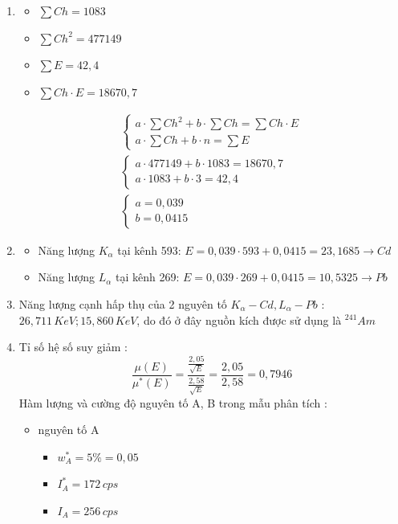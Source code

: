 \documentclass[a4paper]{article}
\begin{document}
\section{}
\begin{enumerate}[label=\alph*)]
    \item \hfill 
    \begin{itemize}
        \item $\sum Ch = 1083$
        \item $\sum Ch^2 = 477149$
        \item $\sum E = 42,4$
        \item $\sum Ch \cdot E = 18670,7$
    \end{itemize}
    \begin{gather*}
        \begin{cases}
            a \cdot \sum Ch^2 + b \cdot \sum Ch = \sum Ch \cdot E \\ a  \cdot \sum Ch + b \cdot n = \sum E
        \end{cases}\\
        \begin{cases}
            a \cdot 477149 + b \cdot 1083 = 18670,7 \\ a  \cdot 1083 + b \cdot 3 = 42,4
        \end{cases}\\
        \begin{cases}
            a = 0,039 \\ b = 0,0415
        \end{cases}
    \end{gather*}
    \item 
    \begin{itemize}
        \item Năng lượng $K_\alpha$ tại kênh 593: $E = 0,039 \cdot 593 + 0,0415 = 23,1685 \longrightarrow Cd$
        \item Năng lượng $L_\alpha$ tại kênh 269: $E = 0,039 \cdot 269 + 0,0415 = 10,5325 \longrightarrow Pb$
    \end{itemize}
    \item 
    Năng lượng cạnh hấp thụ của 2 nguyên tố $K_\alpha-Cd, L_\alpha-Pb$ : $26,711\, KeV; 15,860\, KeV$, do đó ở đây nguồn kích được sử dụng là $^{241}Am$
    \item 
    Tỉ số hệ số suy giảm : \[\frac{\mu(E)}{\mu^*(E)} = \frac{\frac{2,05}{\sqrt{E}}}{\frac{2,58}{\sqrt{E}}} = \frac{2,05}{2,58} = 0,7946\]
    Hàm lượng và cường độ nguyên tố A, B trong mẫu phân tích : 
    \begin{itemize}
        \item nguyên tố A 
        \begin{itemize}
            \item $w_A^* = 5\% = 0,05$
            \item $I^*_A = 172 \, cps$
            \item $I_A = 256 \, cps$
        \end{itemize}


\end{itemize}
\end{enumerate}
\end{document}
